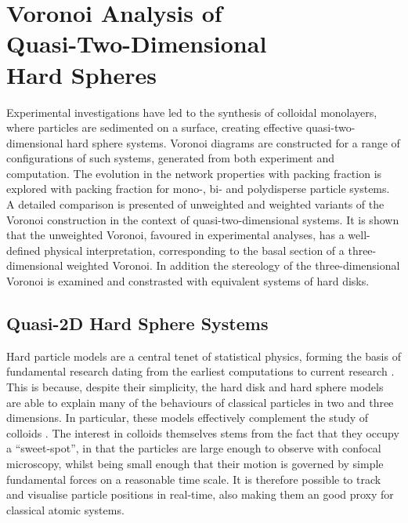 \chapter[Voronoi Analysis of Quasi\--Two\--Dimensional Hard Spheres]{Voronoi Analysis of \\ Quasi\--Two\--Dimensional \\ Hard Spheres} 
\label{ch:quasi2d}

\begin{chapterabstract}
Experimental investigations have led to the synthesis of colloidal monolayers, where particles are sedimented on a surface, creating effective quasi\--two\--dimensional hard sphere systems.
Voronoi diagrams are constructed for a range of configurations of such systems, generated from both experiment and computation.
The evolution in the network properties with packing fraction is explored with packing fraction for mono\--, bi\-- and polydisperse particle systems.
A detailed comparison is presented of unweighted and weighted variants of the Voronoi construction in the context of quasi\--two\--dimensional systems.
It is shown that the \td{} unweighted Voronoi, favoured in experimental analyses, has a well\--defined physical interpretation, corresponding to the basal section of a three\--dimensional weighted Voronoi.
In addition the stereology of the three\--dimensional Voronoi is examined and constrasted with equivalent systems of hard disks.
\end{chapterabstract}

\section{Quasi\--2D Hard Sphere Systems}

Hard particle models are a central tenet of statistical physics, forming the basis of fundamental research dating from the earliest computations to current research \cite{Isobe2016}.
This is because, despite their simplicity, the hard disk and hard sphere models are able to explain many of the behaviours of classical particles in two and three dimensions.
In particular, these models effectively complement the study of colloids \cite{Pusey1986}.
The interest in colloids themselves stems from the fact that they occupy a ``sweet\--spot'', in that the particles are large enough to observe with confocal microscopy, whilst being small enough that their motion is governed by simple fundamental forces on a reasonable time scale. 
It is therefore possible to track and visualise particle positions in real\--time, also making them an good proxy for classical atomic systems.

